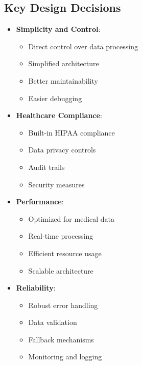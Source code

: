 \documentclass[12pt]{article}
\begin{document}
\subsection{Key Design Decisions}
\begin{itemize}
    \item \textbf{Simplicity and Control}:
    \begin{itemize}
        \item Direct control over data processing
        \item Simplified architecture
        \item Better maintainability
        \item Easier debugging
    \end{itemize}
    \item \textbf{Healthcare Compliance}:
    \begin{itemize}
        \item Built-in HIPAA compliance
        \item Data privacy controls
        \item Audit trails
        \item Security measures
    \end{itemize}
    \item \textbf{Performance}:
    \begin{itemize}
        \item Optimized for medical data
        \item Real-time processing
        \item Efficient resource usage
        \item Scalable architecture
    \end{itemize}
    \item \textbf{Reliability}:
    \begin{itemize}
        \item Robust error handling
        \item Data validation
        \item Fallback mechanisms
        \item Monitoring and logging
    \end{itemize}
\end{itemize}
\end{document}
